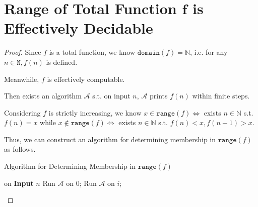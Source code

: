 \documentclass{article}
\begin{document}
\section{Range of Total Function $\boldsymbol{f}$ is Effectively Decidable}
\vspace{1em}
\begin{proof}
    Since $f$ is a total function, we know $\mathtt{domain}(f)=\mathbb{N}$, i.e. for any $n\in\mathtt{N}, f(n)$ is defined.
    
    \hspace{1.3em}
    Meanwhile, $f$ is effectively computable.
    
    \hspace{1.3em}
    Then exists an algorithm $\mathcal{A}$ s.t. on input $n$, $\mathcal{A}$ prints $f(n)$ within finite steps.
    
    \hspace{1.3em}
    Considering $f$ is strictly increasing, we know $x\in\mathtt{range}(f) \Longleftrightarrow $ exists $n\in\mathbb{N}$ s.t. $f(n)=x$ while $x\notin\mathtt{range}(f) \Longleftrightarrow $ exists $n\in\mathbb{N}$ s.t. $f(n)<x, f(n+1)>x$.

    \vspace{1em} \hspace{1.3em}
    Thus, we can construct an algorithm for determining membership in $\mathtt{range}(f)$ as follows.

    \vspace{-0.5em}
    \begin{algorithm}
        \caption{Algorithm for Determining Membership in $\mathtt{range}(f)$}
        
	    {
        on \textbf{Input} $n$\;
        Run $\mathcal{A}$ on $0$; \quad{}
	    {
            Run $\mathcal{A}$ on $i$; \quad{}
	    }

        }
    \end{algorithm}
    

\end{proof}
\end{document}
